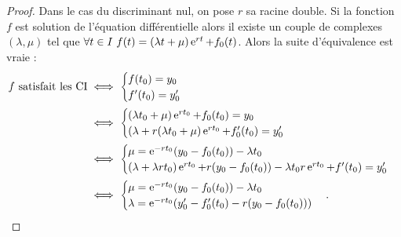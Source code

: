 \begin{proof}
Dans le cas du discriminant nul, on pose \(r\) sa racine double. Si la fonction \(f\) est solution de l'équation différentielle alors il existe un couple de complexes \((\lambda, \mu)\) tel que \(\forall t \in I \ f(t)=(\lambda t+\mu)\operatorname{e}^{rt}+f_0(t)\). Alors la suite d'équivalence est vraie :
  \begin{align}
    f \text{~satisfait les CI} &\iff \begin{cases} f(t_0)=y_0 \\ f'(t_0)=y'_0 \end{cases}\\ 
    &\iff \begin{cases}(\lambda t_0+\mu)\operatorname{e}^{rt_0}+f_0(t_0)=y_0 \\ (\lambda+r(\lambda t_0 +\mu)\operatorname{e}^{rt_0}+f_0'(t_0)=y'_0\end{cases}\\ 
    &\iff \begin{cases}\mu=\operatorname{e}^{-rt_0}(y_0-f_0(t_0))-\lambda t_0 \\ (\lambda+\lambda r t_0)\operatorname{e}^{rt_0}+r(y_0-f_0(t_0))-\lambda t_0 r \operatorname{e}^{rt_0}+f'(t_0)=y'_0\end{cases}\\ 
    &\iff \begin{cases}\mu=\operatorname{e}^{-rt_0}(y_0-f_0(t_0))-\lambda t_0\\ \lambda = \operatorname{e}^{-rt_0}(y'_0 -f'_0(t_0)-r(y_0-f_0(t_0))) \end{cases}.
  \end{align}
\end{proof}
\clearpage
